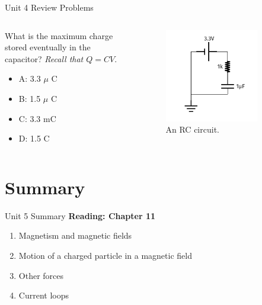 \documentclass{beamer}
\begin{document}
\begin{frame}{Unit 4 Review Problems}
\begin{columns}[T]
\begin{column}{0.5\textwidth}
What is the maximum charge stored eventually in the capacitor?  \textit{Recall that $Q = CV$}.
\begin{itemize}
\item A: 3.3 $\mu$ C
\item B: 1.5 $\mu$ C
\item C: 3.3 mC
\item D: 1.5 C
\end{itemize}
\end{column}
\begin{column}{0.5\textwidth}
\begin{figure}
\centering
\includegraphics[width=0.8\textwidth]{figures/iVCurve7.pdf}
\caption{\label{fig:RC2} An RC circuit.}
\end{figure}
\end{column}
\end{columns}
\end{frame}

\section{Summary}

\begin{frame}{Unit 5 Summary}
\textbf{Reading: Chapter 11}
\begin{enumerate}
\item Magnetism and magnetic fields
\item \alert{Motion of a charged particle in a magnetic field}
\item Other forces
\item Current loops
\end{enumerate}
\end{frame}
\end{document}

